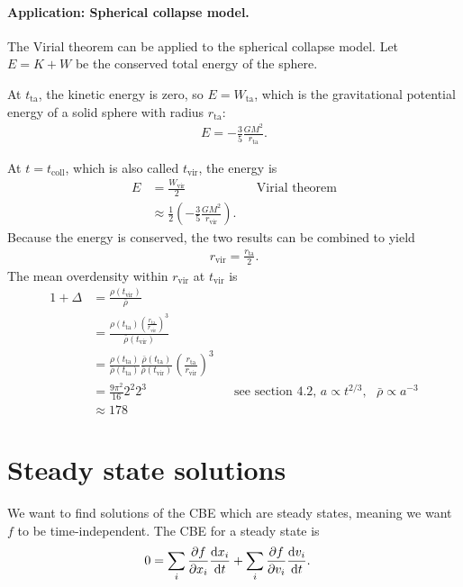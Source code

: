 \paragraph*{Application: Spherical collapse model.}
The Virial theorem can be applied to the spherical collapse model.
Let $E = K + W$ be the conserved total energy of the sphere.

At $t_\text{ta}$, the kinetic energy is zero, so $E = W_\text{ta}$, which is the gravitational potential energy of a solid sphere with radius $r_\text{ta}$:
\begin{align*}
	E = - \frac{3}{5} \frac{G M^2}{r_\text{ta}}.
\end{align*}

At $t = t_\text{coll}$, which is also called $t_\text{vir}$, the energy is
\begin{align*}
	E
	&= \frac{W_\text{vir}}{2}
	&&\text{Virial theorem}\\
	&\approx \frac{1}{2}\left( - \frac{3}{5} \frac{GM^2}{r_\text{vir}} \right).
\end{align*}
Because the energy is conserved, the two results can be combined to yield
\begin{align*}
	r_\text{vir} = \frac{r_\text{ta}}{2}.
\end{align*}
The mean overdensity within $r_\text{vir}$ at $t_\text{vir}$ is
\begin{align*}
	1 + \Delta
	&= \frac{\rho(t_\text{vir})}{\bar{\rho}}\\
	&= \frac{ \rho(t_\text{ta}) \left(\frac{r_\text{ta}}{r_\text{vir}}\right)^3  }{\bar{\rho}(t_\text{vir})}\\
	&= \frac{\rho(t_\text{ta})}{\bar{\rho}(t_\text{ta})}
	\frac{\bar{\rho}(t_\text{ta})}{\bar{\rho}(t_\text{vir})}
	\left( \frac{r_\text{ta}}{r_\text{vir}} \right)^3\\
	&= \frac{9\pi^2}{16}   2^2 2^3
	&&\text{see section 4.2, } a \propto t^{2/3}, \text{ } \bar{\rho} \propto a^{-3}\\
	&\approx 178
\end{align*}


\section{Steady state solutions}

We want to find solutions of the CBE which are steady states, meaning we want $f$ to be time-independent. The CBE for a steady state is
\begin{align*}
	0
	&= \sum_{i} \pdv{f}{x_i} \dv{x_i}{t}
	+ \sum_{i} \pdv{f}{v_i} \dv{v_i}{t}.
\end{align*}

